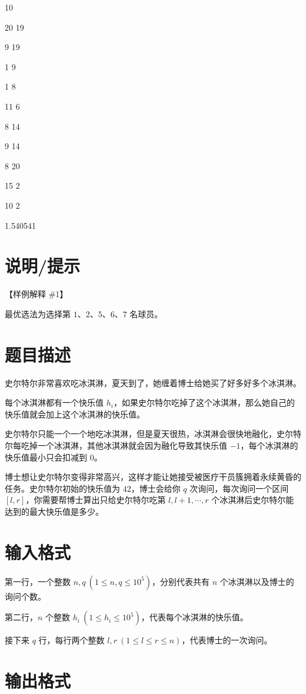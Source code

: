 \documentclass{../cpct/ctpro}
\begin{document}
\testcasetab
{
    10\par
    20 19\par
    9 19\par
    1 9\par
    1 8\par
    11 6\par
    8 14\par
    9 14\par
    8 20\par
    15 2\par
    10 2
}
{
    1.540541
}

\section*{说明/提示}

【样例解释 \#1】

最优选法为选择第 $1$、$2$、$5$、$6$、$7$ 名球员。

\makeproblem
\section*{题目描述}

史尔特尔非常喜欢吃冰淇淋，夏天到了，她缠着博士给她买了好多好多个冰淇淋。

每个冰淇淋都有一个快乐值 $h_i$，如果史尔特尔吃掉了这个冰淇淋，那么她自己的快乐值就会加上这个冰淇淋的快乐值。

史尔特尔只能一个一个地吃冰淇淋，但是夏天很热，冰淇淋会很快地融化，史尔特尔每吃掉一个冰淇淋，其他冰淇淋就会因为融化导致其快乐值 $-1$，每个冰淇淋的快乐值最小只会扣减到 $0$。

博士想让史尔特尔变得非常高兴，这样才能让她接受被医疗干员簇拥着永续黄昏的任务。史尔特尔初始的快乐值为 $42$，博士会给你 $q$ 次询问，每次询问一个区间 $[l,r]$，你需要帮博士算出只给史尔特尔吃第 $l,l+1,\cdots,r$ 个冰淇淋后史尔特尔能达到的最大快乐值是多少。

\section*{输入格式}

第一行，一个整数 $n,q~(1 \leq n,q \leq {10}^5)$，分别代表共有 $n$ 个冰淇淋以及博士的询问个数。

第二行，$n$ 个整数 $h_i~(1 \leq h_i \leq {10}^5)$，代表每个冰淇淋的快乐值。

接下来 $q$ 行，每行两个整数 $l,r~(1 \leq l \leq r \leq n)$，代表博士的一次询问。

\section*{输出格式}
\end{document}

